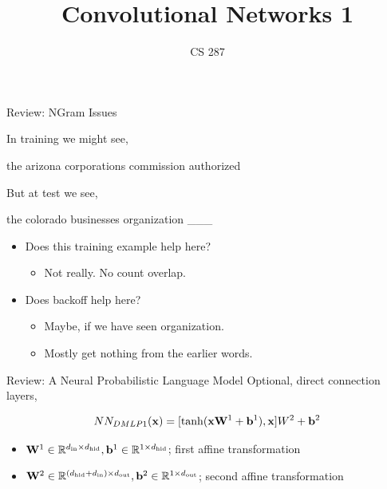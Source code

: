 \documentclass{beamer}
\title{Convolutional Networks 1}
\date{}
\author{CS 287}
\begin{document}
\begin{frame}
  \titlepage
\end{frame}

\begin{frame}{Review: NGram Issues}
  
  In training we might see, 

  \begin{center}
    the arizona corporations commission \alert{authorized}
  \end{center}

  But at test we see, 
  \begin{center}
    the colorado businesses organization \alert{\_\_\_}
  \end{center}
  \pause 
  
  \begin{itemize}
  \item Does this training example help here?
    \begin{itemize}
    \item Not really. No count overlap.
    \end{itemize}
    \air 
    \pause 
  \item Does backoff help here? 
    \begin{itemize}
    \item Maybe, if we have seen organization.
    \item Mostly get nothing from the earlier words.
    \end{itemize}
  \end{itemize}
\end{frame}


\begin{frame}{Review: A Neural Probabilistic Language Model }  
  Optional, direct connection layers,

  \[NN_{DMLP1}(\mathbf{x}) =  [\tanh(\mathbf{x}\mathbf{W}^1 + \mathbf{b}^1), \mathbf{x}] W^2 + \mathbf{b}^2\]

  \begin{itemize}
  \item $\mathbf{W}^1 \in \mathbb{R}^{{d_{\mathrm{in}}} \times {d_{\mathrm{hid}}}}, \mathbf{b}^1 \in \mathbb{R}^{1 \times {d_{\mathrm{hid}}}}$; first affine transformation
  \item $\mathbf{W}^2 \in \mathbb{R}^{({d_{\mathrm{hid}}} + {d_{\mathrm{in}}})  \times {d_{\mathrm{out}}}}, \mathbf{b}^2 \in \mathbb{R}^{1 \times {d_{\mathrm{out}}}}$; second affine transformation
  \end{itemize}
\end{frame}
\end{document}
